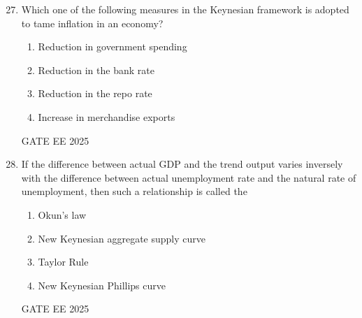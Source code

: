 \documentclass[journal,12pt,onecolumn]{IEEEtran}
\theoremstyle{remark}
\begin{document}
\begin{enumerate}
    \setcounter{enumi}{26} %

    \item Which one of the following measures in the Keynesian framework is adopted to tame inflation in an economy?
    \begin{enumerate}[label=(\Alph*)]
        \item Reduction in government spending
        \item Reduction in the bank rate
        \item Reduction in the repo rate
        \item Increase in merchandise exports
    \end{enumerate}
GATE EE 2025\\

    \item If the difference between actual GDP and the trend output varies inversely with the difference between actual unemployment rate and the natural rate of unemployment, then such a relationship is called the
    \begin{enumerate}[label=(\Alph*)]
        \item Okun’s law
        \item New Keynesian aggregate supply curve
        \item Taylor Rule
        \item New Keynesian Phillips curve
    \end{enumerate}
GATE EE 2025\\


\end{enumerate}
\end{document}
